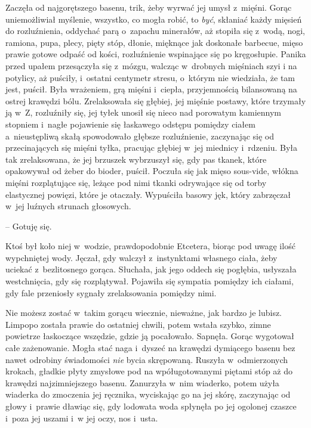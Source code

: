 \documentclass[oneside,polish,11pt,sfheadings]{mwbk}
\begin{document}
Zaczęła od najgorętszego basenu, trik, żeby wyrwać jej umysł z~mięśni.
Gorąc uniemożliwiał myślenie, wszystko, co mogła robić, to \textit{być},
skłaniać każdy mięsień do rozluźnienia, oddychać parą o~zapachu
minerałów, aż stopiła się z~wodą, nogi, ramiona, pupa, plecy, pięty
stóp, dłonie, mięknące jak doskonałe barbecue, mięso prawie gotowe
odpaść od kości, rozluźnienie wspinające się po kręgosłupie. Panika
przed upałem przesączyła się z~mózgu, walcząc w~drobnych mięśniach szyi
i na potylicy, aż puściły, i~ostatni centymetr stresu, o~którym nie
wiedziała, że tam jest, puścił. Była wrażeniem, grą mięśni i~ciepła,
przyjemnością bilansowaną na ostrej krawędzi bólu. Zrelaksowała się
głębiej, jej mięśnie postawy, które trzymały ją w~Z, rozluźniły się, jej
tyłek unosił się nieco nad porowatym kamiennym stopniem i~nagłe
pojawienie się łaskawego odstępu pomiędzy ciałem a~nieustępliwą skałą
spowodowało głębsze rozluźnienie, zaczynając się od przecinających się
mięśni tyłka, pracując głębiej w~jej miednicy i~rdzeniu. Była tak
zrelaksowana, że jej brzuszek wybrzuszył się, gdy pas tkanek, które
opakowywał od żeber do bioder, puścił. Poczuła się jak mięso sous-vide,
włókna mięśni rozplątujące się, leżące pod nimi tkanki odrywające się od
torby elastycznej powięzi, które je otaczały. Wypuściła basowy jęk,
który zabrzęczał w~jej luźnych strunach głosowych. 

-- Gotuję się.

Ktoś był koło niej w~wodzie, prawdopodobnie Etcetera, biorąc pod uwagę
ilość wypchniętej wody. Jęczał, gdy walczył z~instynktami własnego
ciała, żeby uciekać z~bezlitosnego gorąca. Słuchała, jak jego oddech się
pogłębia, usłyszała westchnięcia, gdy się rozplątywał. Pojawiła się
sympatia pomiędzy ich ciałami, gdy fale przeniosły sygnały zrelaksowania
pomiędzy nimi.

Nie możesz zostać w~takim gorącu wiecznie, nieważne, jak bardzo je
lubisz. Limpopo została prawie do ostatniej chwili, potem wstała szybko,
zimne powietrze łaskoczące wszędzie, gdzie ją pocałowało. Sapnęła. Gorąc
wygotował całe zażenowanie. Mogła stać naga i~dyszeć na krawędzi
dymiącego basenu bez nawet odrobiny świadomości \textit{nie} bycia
skrępowaną. Ruszyła w~odmierzonych krokach, gładkie płyty zmysłowe pod
na wpóługotowanymi piętami stóp aż do krawędzi najzimniejszego basenu.
Zanurzyła w~nim wiaderko, potem użyła wiaderka do zmoczenia jej
ręcznika, wyciskając go na jej skórę, zaczynając od głowy i~prawie
dławiąc się, gdy lodowata woda spłynęła po jej ogolonej czaszce i~poza
jej uszami i~w jej oczy, nos i~usta.
\end{document}
